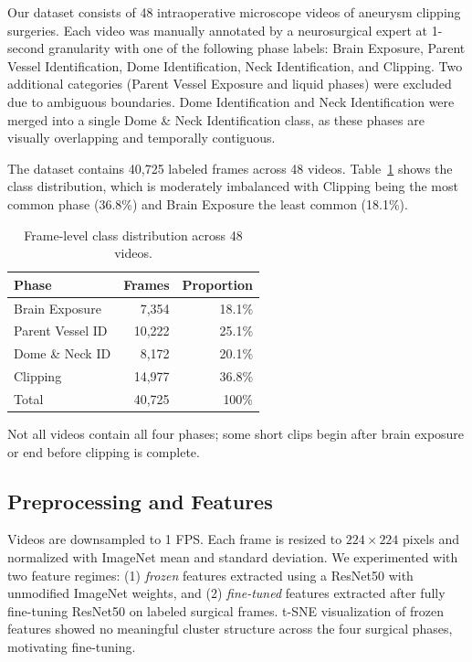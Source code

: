 \documentclass[10pt,twocolumn]{article}
\begin{document}
Our dataset consists of 48 intraoperative microscope videos of aneurysm clipping surgeries. Each video was manually annotated by a neurosurgical expert at 1-second granularity with one of the following phase labels: Brain Exposure, Parent Vessel Identification, Dome Identification, Neck Identification, and Clipping. Two additional categories (Parent Vessel Exposure and liquid phases) were excluded due to ambiguous boundaries. Dome Identification and Neck Identification were merged into a single Dome \& Neck Identification class, as these phases are visually overlapping and temporally contiguous.

The dataset contains 40,725 labeled frames across 48 videos. Table~\ref{tab:class_dist} shows the class distribution, which is moderately imbalanced with Clipping being the most common phase (36.8\%) and Brain Exposure the least common (18.1\%).

\begin{table}[h]
\centering
\small
\begin{tabular}{lrr}
\toprule
Phase & Frames & Proportion \\
\midrule
Brain Exposure         & 7,354  & 18.1\% \\
Parent Vessel ID       & 10,222 & 25.1\% \\
Dome \& Neck ID        & 8,172  & 20.1\% \\
Clipping               & 14,977 & 36.8\% \\
\midrule
Total                  & 40,725 & 100\% \\
\bottomrule
\end{tabular}
\caption{Frame-level class distribution across 48 videos.}
\label{tab:class_dist}
\end{table}

Not all videos contain all four phases; some short clips begin after brain exposure or end before clipping is complete.

\subsection{Preprocessing and Features}

Videos are downsampled to 1 FPS. Each frame is resized to $224 \times 224$ pixels and normalized with ImageNet mean and standard deviation. We experimented with two feature regimes: (1) \emph{frozen} features extracted using a ResNet50 with unmodified ImageNet weights, and (2) \emph{fine-tuned} features extracted after fully fine-tuning ResNet50 on labeled surgical frames. t-SNE visualization of frozen features showed no meaningful cluster structure across the four surgical phases, motivating fine-tuning.
\end{document}
